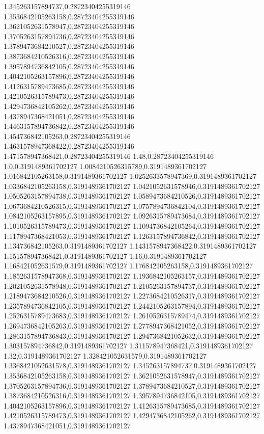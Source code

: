 1.345263157894737,0.28723404255319146
1.3536842105263158,0.28723404255319146
1.3621052631578947,0.28723404255319146
1.3705263157894736,0.28723404255319146
1.3789473684210527,0.28723404255319146
1.3873684210526316,0.28723404255319146
1.3957894736842105,0.28723404255319146
1.4042105263157896,0.28723404255319146
1.4126315789473685,0.28723404255319146
1.4210526315789473,0.28723404255319146
1.4294736842105262,0.28723404255319146
1.4378947368421051,0.28723404255319146
1.4463157894736842,0.28723404255319146
1.454736842105263,0.28723404255319146
1.4631578947368422,0.28723404255319146
1.471578947368421,0.28723404255319146
1.48,0.28723404255319146
1.0,0.3191489361702127
1.0084210526315789,0.3191489361702127
1.016842105263158,0.3191489361702127
1.0252631578947369,0.3191489361702127
1.0336842105263158,0.3191489361702127
1.0421052631578946,0.3191489361702127
1.0505263157894738,0.3191489361702127
1.0589473684210526,0.3191489361702127
1.0673684210526315,0.3191489361702127
1.0757894736842104,0.3191489361702127
1.0842105263157895,0.3191489361702127
1.0926315789473684,0.3191489361702127
1.1010526315789473,0.3191489361702127
1.1094736842105264,0.3191489361702127
1.1178947368421053,0.3191489361702127
1.1263157894736842,0.3191489361702127
1.134736842105263,0.3191489361702127
1.1431578947368422,0.3191489361702127
1.151578947368421,0.3191489361702127
1.16,0.3191489361702127
1.168421052631579,0.3191489361702127
1.176842105263158,0.3191489361702127
1.1852631578947368,0.3191489361702127
1.1936842105263157,0.3191489361702127
1.2021052631578948,0.3191489361702127
1.2105263157894737,0.3191489361702127
1.2189473684210526,0.3191489361702127
1.2273684210526317,0.3191489361702127
1.2357894736842105,0.3191489361702127
1.2442105263157894,0.3191489361702127
1.2526315789473683,0.3191489361702127
1.2610526315789474,0.3191489361702127
1.2694736842105263,0.3191489361702127
1.2778947368421052,0.3191489361702127
1.2863157894736843,0.3191489361702127
1.2947368421052632,0.3191489361702127
1.303157894736842,0.3191489361702127
1.311578947368421,0.3191489361702127
1.32,0.3191489361702127
1.328421052631579,0.3191489361702127
1.3368421052631578,0.3191489361702127
1.345263157894737,0.3191489361702127
1.3536842105263158,0.3191489361702127
1.3621052631578947,0.3191489361702127
1.3705263157894736,0.3191489361702127
1.3789473684210527,0.3191489361702127
1.3873684210526316,0.3191489361702127
1.3957894736842105,0.3191489361702127
1.4042105263157896,0.3191489361702127
1.4126315789473685,0.3191489361702127
1.4210526315789473,0.3191489361702127
1.4294736842105262,0.3191489361702127
1.4378947368421051,0.3191489361702127
